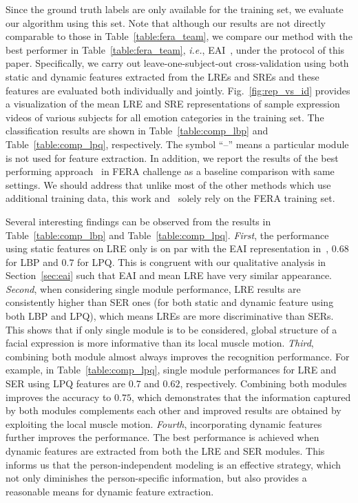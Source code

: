 \documentclass[journal]{IEEEtran}
\begin{document}
Since the ground truth labels are only available for the training set, we evaluate our algorithm using this set. Note that although our results are not directly comparable to those in Table~\ref{table:fera_team}, we compare our method with the best performer in Table~\ref{table:fera_team}, \textit{i.e.}, EAI~\cite{Yang_SMCB12}, under the protocol of this paper. Specifically, we carry out leave-one-subject-out cross-validation using both static and dynamic features extracted from the LREs and SREs and these features are evaluated both individually and jointly. Fig.~\ref{fig:rep_vs_id} provides a visualization of the mean LRE and SRE representations of sample expression videos of various subjects for all emotion categories in the training set. The classification results are shown in Table~\ref{table:comp_lbp} and Table~\ref{table:comp_lpq}, respectively. The symbol ``--'' means a particular module is not used for feature extraction. In addition, we report the results of the best performing approach~\cite{Yang_SMCB12} in FERA challenge as a baseline comparison with same settings. We should address that unlike most of the other methods which use additional training data, this work and~\cite{Yang_SMCB12} solely rely on the FERA training set. 

Several interesting findings can be observed from the results in Table~\ref{table:comp_lbp} and Table~\ref{table:comp_lpq}. \textit{First}, the performance using static features on LRE only is on par with the EAI representation in~\cite{Yang_SMCB12}, $0.68$ for LBP and $0.7$ for LPQ. This is congruent with our qualitative analysis in Section~\ref{sec:eai} such that EAI and mean LRE have very similar appearance. \textit{Second}, when considering single module performance, LRE results are consistently higher than SER ones (for both static and dynamic feature using both LBP and LPQ), which means LREs are more discriminative than SERs. This shows that if only single module is to be considered, global structure of a facial expression is more informative than its local muscle motion. \textit{Third}, combining both module almost always improves the recognition performance. For example, in Table~\ref{table:comp_lpq}, single module performances for LRE and SER using LPQ features are $0.7$ and $0.62$, respectively. Combining both modules improves the accuracy to $0.75$, which demonstrates that the information captured by both modules complements each other and improved results are obtained by exploiting the local muscle motion. \textit{Fourth}, incorporating dynamic features further improves the performance. The best performance is achieved when dynamic features are extracted from both the LRE and SER modules. This informs us that the person-independent modeling is an effective strategy, which not only diminishes the person-specific information, but also provides a reasonable means for dynamic feature extraction. 
\end{document}
